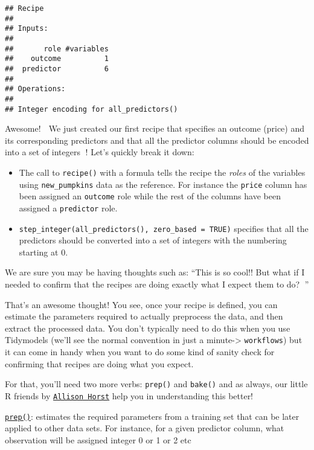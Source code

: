 \documentclass[
]{article}
\begin{document}
\begin{verbatim}
## Recipe
## 
## Inputs:
## 
##       role #variables
##    outcome          1
##  predictor          6
## 
## Operations:
## 
## Integer encoding for all_predictors()
\end{verbatim}

Awesome! 👏 We just created our first recipe that specifies an outcome
(price) and its corresponding predictors and that all the predictor
columns should be encoded into a set of integers 🙌! Let's quickly break
it down:

\begin{itemize}
\item
  The call to \texttt{recipe()} with a formula tells the recipe the
  \emph{roles} of the variables using \texttt{new\_pumpkins} data as the
  reference. For instance the \texttt{price} column has been assigned an
  \texttt{outcome} role while the rest of the columns have been assigned
  a \texttt{predictor} role.
\item
  \texttt{step\_integer(all\_predictors(),\ zero\_based\ =\ TRUE)}
  specifies that all the predictors should be converted into a set of
  integers with the numbering starting at 0.
\end{itemize}

We are sure you may be having thoughts such as: ``This is so cool!! But
what if I needed to confirm that the recipes are doing exactly what I
expect them to do? 🤔''

That's an awesome thought! You see, once your recipe is defined, you can
estimate the parameters required to actually preprocess the data, and
then extract the processed data. You don't typically need to do this
when you use Tidymodels (we'll see the normal convention in just a
minute-\textgreater{} \texttt{workflows}) but it can come in handy when
you want to do some kind of sanity check for confirming that recipes are
doing what you expect.

For that, you'll need two more verbs: \texttt{prep()} and
\texttt{bake()} and as always, our little R friends by
\href{https://github.com/allisonhorst/stats-illustrations}{\texttt{Allison\ Horst}}
help you in understanding this better!

\href{https://recipes.tidymodels.org/reference/prep.html}{\texttt{prep()}}:
estimates the required parameters from a training set that can be later
applied to other data sets. For instance, for a given predictor column,
what observation will be assigned integer 0 or 1 or 2 etc
\end{document}
